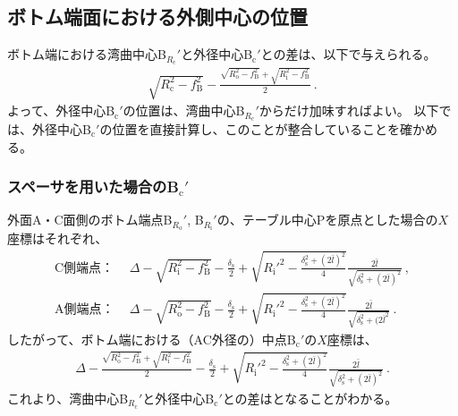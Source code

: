 \subsection{ボトム端面における外側中心の位置}
ボトム端における湾曲中心B$_{R_\mathrm c}'$と外径中心B$_\mathrm c'$との差は、以下で与えられる。
\begin{align}
  \label{eq:BRc-Bc}
  \sqrt{R_\mathrm c^2-f_\mathrm B^2}
  -\frac{\sqrt{R_\mathrm o^2-f_\mathrm B^2}+\sqrt{R_\mathrm i^2-f_\mathrm B^2}}2\ .
\end{align}
よって、外径中心B$_\mathrm c'$の位置は、湾曲中心B$_{R_\mathrm c}'$からだけ加味すればよい。
以下では、外径中心B$_\mathrm c'$の位置を直接計算し、このことが整合していることを確かめる。


\subsubsection{スペーサを用いた場合のB\texorpdfstring{$_\mathrm c'$}{c'}}
外面A・C面側のボトム端点B$_{R_\mathrm o}'$, B$_{R_\mathrm i}'$の、テーブル中心Pを原点とした場合の$X$座標はそれぞれ、
\begin{align*}
  \text{C側端点：}&~~
  \Delta-\sqrt{R_\mathrm i^2-f_\mathrm B^2}-\frac{\delta_\mathrm s}2+\sqrt{R_\mathrm i'^2-\frac{\delta_\mathrm s^2+(2\bar l)^2}4}\frac{2\bar l}{\sqrt{\delta_\mathrm s^2+(2\bar l)^2}}\ ,\\
  \text{A側端点：}&~~
  \Delta-\sqrt{R_\mathrm o^2-f_\mathrm B^2}-\frac{\delta_\mathrm s}2+\sqrt{R_\mathrm i'^2-\frac{\delta_\mathrm s^2+(2\bar l)^2}4}\frac{2\bar l}{\sqrt{\delta_\mathrm s^2+(2\bar l^2}}\ .
\end{align*}
したがって、ボトム端における（AC外径の）中点B$_\mathrm c'$の$X$座標は、
\begin{align}
  \label{eq:spacerBc}
  \Delta-\frac{\sqrt{R_\mathrm o^2-f_\mathrm B^2}+\sqrt{R_\mathrm i^2-f_\mathrm B^2}}2
  -\frac{\delta_\mathrm s}2+\sqrt{R_\mathrm i'^2-\frac{\delta_\mathrm s^2+(2\bar l)^2}4}\frac{2\bar l}{\sqrt{\delta_\mathrm s^2+(2\bar l)^2}}\ .
\end{align}
これより、湾曲中心B$_{R_\mathrm c}'$と外径中心B$_\mathrm c'$との差はとなることがわかる。



